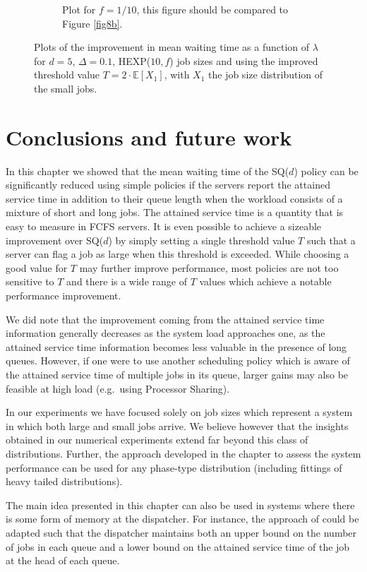 \documentclass[12pt]{report}
\newcommand{\E}{\mathbb{E}}
\begin{document}
\begin{figure}[t]
\begin{center}
\begin{subfigure}{.43\textwidth}
\caption{Plot for $f=1/10$, this figure should be compared to Figure \ref{fig8b}.}
\label{fig13b}
\end{subfigure}
\caption{Plots of the improvement in mean waiting time as a function of $\lambda$ for $d=5$, $\Delta=0.1$, HEXP($10,f$) job sizes and using the improved threshold value $T = 2\cdot \E[X_1]$, with $X_1$ the job size distribution of the small jobs.}
\label{fig13}
\end{center}
\end{figure}


\section{Conclusions and future work} \label{sec:conclusion}
In this chapter we showed that the mean waiting time of the SQ($d$) policy can be significantly reduced using simple policies if the servers report the attained service time in addition to
their queue length when the workload consists of a mixture of short and long jobs. 
The attained service time is a quantity that is easy to measure in
FCFS servers.  It is even possible to achieve a sizeable improvement over SQ($d$) by simply setting a single threshold value $T$ such that a server can flag a job as large when this threshold is exceeded. While choosing a good value for $T$ may further improve performance, most policies are not too sensitive to $T$ and there is a wide range of $T$ values which 
achieve a notable performance improvement. 


We did note that the improvement coming from the attained service time information 
generally decreases as the system load approaches one, as the attained service time
information becomes less valuable in the presence of long queues. However, if one were to use another scheduling policy which is aware of the attained service time of multiple jobs in its queue, larger gains may also be feasible at high load (e.g.~using Processor Sharing).

In our experiments we have focused solely on job sizes which represent a system in which both large and small jobs arrive. We 
believe however that the insights obtained in our numerical experiments extend far beyond this
class of distributions. Further, the approach developed in the chapter to assess the system performance can be used for any phase-type distribution (including fittings of heavy tailed distributions).

The main idea presented in this chapter can also be used in systems where there is
some form of memory at the dispatcher. For instance, the approach of
\cite{van2019hyper} could be adapted such that the dispatcher 
maintains both an upper bound on the number of jobs in each queue and a lower bound on the 
attained service time of the job at the head of each queue.
\end{document}
